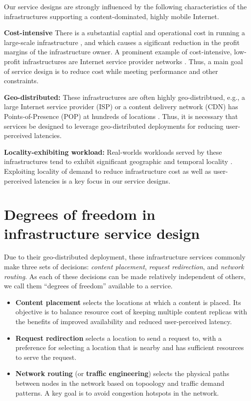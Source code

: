 Our service designs are strongly influenced by the following characteristics of the infrastructures supporting a content-dominated, highly mobile Internet.

\textbf{Cost-intensive} There is a substantial captial and operational cost in running a large-scale infrastructure \cite{greenberg2008cost}, and which causes a sigificant reduction in the profit margins of the infrastructure owner. A prominent example of cost-intensive, low-profit infrastructures are Internet service provider networks \cite{isp-low-profit}. Thus, a main goal of service design is to reduce cost while meeting performance and other constraints. 

\textbf{Geo-distributed:} These infrastructures are often highly geo-distribtued, e.g., a large Internet service provider (ISP) or a content delivery network (CDN) has Points-of-Presence (POP) at hundreds of locations \cite{dilley2002globally}. Thus, it is necessary that services be designed to leverage geo-distributed deployments for reducing user-perceived latencies.

\textbf{Locality-exhibiting workload:} Real-worlds workloads served by these infrastructures tend to exhibit significant geographic and temporal locality \cite{NCDN, youtubeUGC, vodP2Pbenefit, cellularvideotraffic}. Exploiting locality of demand to reduce infrastructure cost as well as user-perceived latencies is a key focus in our service designs.

\section{Degrees of freedom in infrastructure service design} 

Due to their geo-distributed deployment, these infrastructure services commonly make three sets of decisions: \emph{content placement}, \emph{request redirection}, and \emph{network routing}. As each of these decisions can be made relatively independent of others, we call them ``degrees of freedom'' available to a service.

\begin{itemize}
	\item
	\textbf{Content placement} selects the locations at which a content is placed. Its objective  is to balance resource cost of keeping multiple content replicas with the benefits of improved availability and reduced user-perceived latency.
	\item
	\textbf{Request redirection} selects a location to send a request to, with a preference for selecting a location that is nearby and has sufficient resources to serve the request.
	\item
	\textbf{Network routing} (or \textbf{traffic engineering}) selects the physical paths between nodes in the network based on topoology and traffic demand patterns. A key goal is to avoid congestion hotspots in the network.
\end{itemize}


